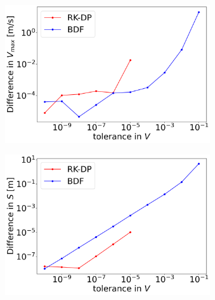 \begin{figure}[H]
	\centering
	\begin{subfigure}[t]{0.32\textwidth}
		\centering
		\includegraphics[width=1\textwidth]{images/TANDEMextendedODEDifferentTolerancesSize101_EQ_Vmax.png}
	\end{subfigure} 
	\begin{subfigure}[t]{0.32\textwidth}
		\centering
		\includegraphics[width=1\textwidth]{images/TANDEMextendedODEDifferentTolerancesSize101_EQ_Smin.png}
	\end{subfigure}
	\begin{subfigure}[t]{0.32\textwidth}
		\centering

\end{subfigure}
\end{figure}
